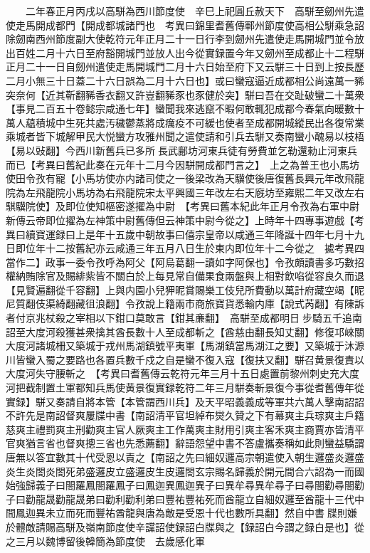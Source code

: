 　　二年春正月丙戌以高駢為西川節度使　辛巳上祀圓丘赦天下　高駢至劒州先遣使走馬開成都門【開成都城諸門也　考異曰錦里耆舊傳鄆州節度使高相公駢乘急詔除劒南西州節度副大使乾符元年正月二十一日行李到劒州先遣使走馬開城門並令放出百姓二月十六日至府豁開城門並放人出今從實録置今年又劒州至成都止十二程駢正月二十一日自劒州遣使走馬開城門二月十六日始至府下又云駢三十日到上按長歷二月小無三十日蓋二十六日誤為二月十六日也】或曰蠻寇逼近成都相公尚遠萬一豨突奈何【近其靳翻豨香衣翻又許豈翻豨豕也豕健於突】駢曰吾在交趾破蠻二十萬衆【事見二百五十卷懿宗咸通七年】蠻聞我來逃竄不暇何敢輒犯成都今春氣向暖數十萬人藴積城中生死共處汚穢鬱蒸將成癘疫不可緩也使者至成都開城縱民出各復常業乘城者皆下城解甲民大悦蠻方攻雅州聞之遣使請和引兵去駢又奏南蠻小醜易以枝梧【易以䜴翻】今西川新舊兵已多所長武鄜坊河東兵徒有勞費並乞勒還勑止河東兵而已【考異曰舊紀此奏在元年十二月今因駢開成都門言之】　上之為普王也小馬坊使田令孜有寵【小馬坊使亦内諸司使之一後梁改為天驥使後唐復舊長興元年改飛龍院為左飛龍院小馬坊為右飛龍院宋太平興國三年改左右天廐坊至雍熙二年又改左右騏驥院使】及即位使知樞密遂擢為中尉　【考異曰舊本紀此年正月令孜為右軍中尉新傳云帝即位擢為左神策中尉舊傳但云神策中尉今從之】上時年十四專事遊戲【考異曰續寶運録曰上是年十五歲中朝故事曰僖宗皇帝以咸通三年降誕十四年七月十九日即位年十二按舊紀亦云咸通三年五月八日生於東内即位年十二今從之　㨿考異四當作二】政事一委令孜呼為阿父【阿烏葛翻一讀如字阿保也】令孜頗讀書多巧數招權納賄除官及賜緋紫皆不關白於上每見常自備果食兩盤與上相對飲啗從容良久而退【見賢遍翻從千容翻】上與内園小兒狎昵賞賜樂工伎兒所費動以萬計府藏空竭【昵尼質翻伎渠綺翻藏徂浪翻】令孜說上籍兩市商旅寶貨悉輸内庫【說式芮翻】有陳訴者付京兆杖殺之宰相以下鉗口莫敢言【鉗其亷翻】　高駢至成都明日步騎五千追南詔至大度河殺獲甚衆擒其酋長數十人至成都斬之【酋慈由翻長知丈翻】修復邛崍關大度河諸城柵又築城于戎州馬湖鎮號平夷軍【馬湖鎮當馬湖江之要】又築城于沐源川皆蠻入蜀之要路也各置兵數千戍之自是蠻不復入寇【復扶又翻】駢召黄景復責以大度河失守腰斬之　【考異曰耆舊傳云乾符元年三月十五日處置前黎州刺史充大度河把截制置土軍都知兵馬使黄景復實録乾符二年三月駢奏斬景復今事從耆舊傳年從實録】駢又奏請自將本管【本管謂西川兵】及天平昭義義成等軍共六萬人擊南詔詔不許先是南詔督爽屢牒中書【南詔清平官坦綽布爕久贊之下有幕爽主兵琮爽主戶籍慈爽主禮罰爽主刑勸爽主官人厥爽主工作萬爽主財用引爽主客禾爽主商賈亦皆清平官爽猶言省也督爽摠三省也先悉薦翻】辭語怨望中書不答盧攜奏稱如此則蠻益驕謂唐無以答宜數其十代受恩以責之【南詔之先曰細奴邏高宗朝遣使入朝生邏盛炎邏盛炎生炎閤炎閤死弟盛邏皮立盛邏皮生皮邏閤玄宗賜名歸義於開元間合六詔為一而國始強歸義子曰閤羅鳳閤羅鳳子曰鳳迦異鳳迦異子曰異牟尋異牟尋子曰尋閤勸尋閤勸子曰勸龍晟勸龍晟弟曰勸利勸利弟曰豐祐豐祐死而酋龍立自細奴邏至酋龍十三代中間鳳迦異未立而死而豐祐酋龍與唐為敵是受恩十代也數所具翻】然自中書牒則嫌於體敵請賜高駢及嶺南節度使辛讜詔使録詔白牒與之【録詔白今謂之録白是也】從之三月以魏博留後韓簡為節度使　去歲感化軍

